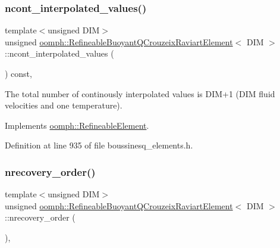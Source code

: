 \subsubsection{\texorpdfstring{ncont\+\_\+interpolated\+\_\+values()}{ncont\_interpolated\_values()}}
{\footnotesize\ttfamily template$<$unsigned D\+IM$>$ \\
unsigned \hyperlink{classoomph_1_1RefineableBuoyantQCrouzeixRaviartElement}{oomph\+::\+Refineable\+Buoyant\+Q\+Crouzeix\+Raviart\+Element}$<$ D\+IM $>$\+::ncont\+\_\+interpolated\+\_\+values (\begin{DoxyParamCaption}{ }\end{DoxyParamCaption}) const\hspace{0.3cm}{\ttfamily [inline]}, {\ttfamily [virtual]}}



The total number of continously interpolated values is D\+I\+M+1 (D\+IM fluid velocities and one temperature). 



Implements \hyperlink{classoomph_1_1RefineableElement_a53e171a18c9f43f1db90a6876516a073}{oomph\+::\+Refineable\+Element}.



Definition at line 935 of file boussinesq\+\_\+elements.\+h.

\mbox{\label{classoomph_1_1RefineableBuoyantQCrouzeixRaviartElement_a18e7035500add323a8d5ce921c9c1b8a}} 
\subsubsection{\texorpdfstring{nrecovery\+\_\+order()}{nrecovery\_order()}}
{\footnotesize\ttfamily template$<$unsigned D\+IM$>$ \\
unsigned \hyperlink{classoomph_1_1RefineableBuoyantQCrouzeixRaviartElement}{oomph\+::\+Refineable\+Buoyant\+Q\+Crouzeix\+Raviart\+Element}$<$ D\+IM $>$\+::nrecovery\+\_\+order (\begin{DoxyParamCaption}{ }\end{DoxyParamCaption})\hspace{0.3cm}{\ttfamily [inline]}, {\ttfamily [virtual]}}



